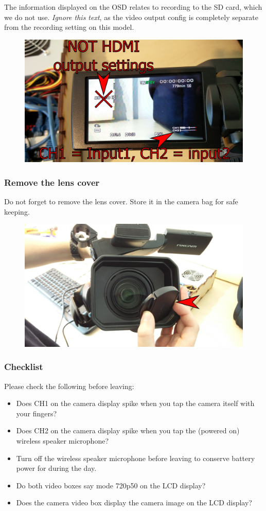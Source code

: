 \documentclass{article}
\begin{document}
The information displayed on the OSD relates to recording to the SD card, which we do not use. \emph{Ignore this text}, as the video output config is completely separate from the recording setting on this model.
\begin{figure}[H]
  \centering
\includegraphics[width = 120mm]{Sony06.jpg}
\end{figure}

\subsubsection{Remove the lens cover}
Do not forget to remove the lens cover. Store it in the camera bag for safe keeping.

\begin{figure}[H]
  \centering
\includegraphics[width = 120mm]{Sony07.jpg}
\end{figure}

\subsubsection{Checklist}
Please check the following before leaving:
\begin{itemize}
  \item Does CH1 on the camera display spike when you tap the camera itself with your fingers?
  \item Does CH2 on the camera display spike when you tap the (powered on) wireless speaker microphone?
  \item Turn off the wireless speaker microphone before leaving to conserve battery power for during the day.
  \item Do both video boxes say mode 720p50 on the LCD display?
  \item Does the camera video box display the camera image on the LCD display?
\end{itemize}
\end{document}
